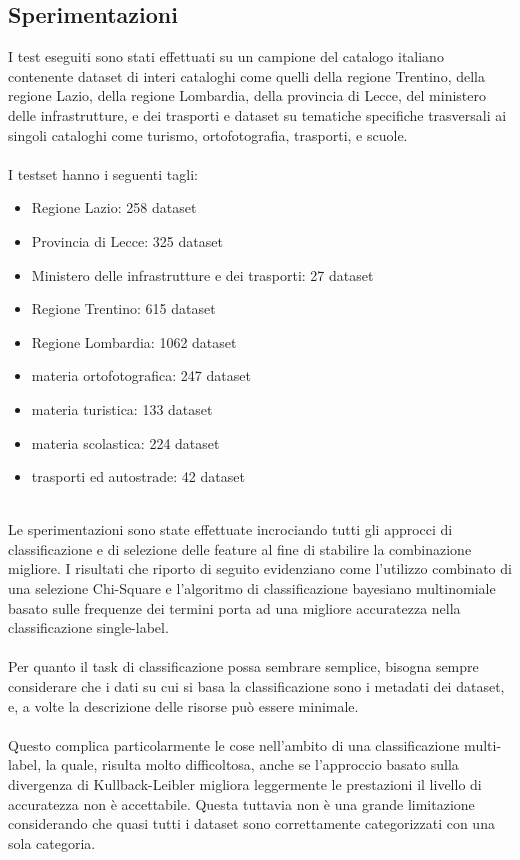 \documentclass{article}
\theoremstyle{plain}
\theoremstyle{definition}
\begin{document}
\subsection{Sperimentazioni}
I test eseguiti sono stati effettuati su un campione del catalogo italiano contenente dataset di interi cataloghi come quelli della regione Trentino, della regione Lazio, della regione Lombardia, della provincia di Lecce, del ministero delle infrastrutture, e dei trasporti e dataset su tematiche specifiche trasversali ai singoli cataloghi come turismo, ortofotografia, trasporti, e scuole.
\\
\\
I testset hanno i seguenti tagli:
\begin{itemize}  
\item Regione Lazio: 258 dataset
\item Provincia di Lecce: 325 dataset
\item Ministero delle infrastrutture e dei trasporti: 27 dataset
\item Regione Trentino: 615 dataset
\item Regione Lombardia: 1062 dataset
\item materia ortofotografica: 247 dataset
\item materia turistica: 133 dataset
\item materia scolastica: 224 dataset
\item trasporti ed autostrade: 42 dataset

\end{itemize}
\phantom
\\
Le sperimentazioni sono state effettuate incrociando tutti gli approcci di classificazione e di selezione delle feature al fine di stabilire la combinazione migliore. I risultati che riporto di seguito evidenziano come l'utilizzo combinato di una selezione Chi-Square e l'algoritmo di classificazione bayesiano multinomiale basato sulle frequenze dei termini porta ad una migliore accuratezza nella classificazione single-label.
\\
\\
Per quanto il task di classificazione possa sembrare semplice, bisogna sempre considerare che i dati su cui si basa la classificazione sono i metadati dei dataset, e, a volte la descrizione delle risorse può essere minimale. 
\\
\\
Questo complica particolarmente le cose nell'ambito di una classificazione multi-label, la quale, risulta molto difficoltosa, anche se l'approccio basato sulla divergenza di Kullback-Leibler migliora leggermente le prestazioni il livello di accuratezza non è accettabile. Questa tuttavia non è una grande limitazione considerando che quasi tutti i dataset sono correttamente categorizzati con una sola categoria.
\newpage
\end{document}
